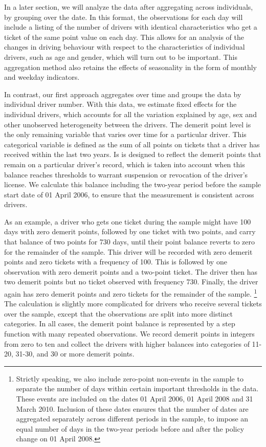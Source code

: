 \documentclass[12pt]{paper}
\begin{document}
In a later section, we will analyze the data after aggregating across individuals, by grouping over the date. 
In this format, the observations for each day will include a listing of the number of drivers with identical characteristics who get a ticket of the same point value on each day. 
This allows for an analysis of the changes in driving behaviour with respect to 
the characteristics of individual drivers, such as age and gender, which will turn out to be important. 
This aggregation method also retains the effects of seasonality in the form of monthly and weekday indicators. 

In contrast, our first approach aggregates over time and groups the data by individual driver number. 
With this data, we estimate fixed effects for the individual drivers, which accounts for all the variation explained by age, sex and other unobserved heterogeneity between the drivers.
The demerit point level is the only remaining variable that varies over time for a particular driver. 
% 
This categorical variable is defined as the sum of all points on tickets that a driver has received within the last two years. 
Is is designed to reflect the demerit points that remain on a particular driver's record, 
which is taken into account when this balance reaches thresholds to warrant suspension or revocation of the driver's license. 
We calculate this balance including the two-year period before the sample start date of 01 April 2006, to ensure that the measurement is consistent across drivers. 

As an example, a driver who gets one ticket during the sample might have 100 days with zero 
demerit points, followed by one ticket with two points, and carry that balance of two points for 730 days, until their point balance reverts to zero for the remainder of the sample. 
This driver will be recorded with zero demerit points and zero tickets with a frequency of 100. 
This is followed by one observation with zero demerit points and a two-point ticket. 
The driver then has two demerit points but no ticket observed with frequency 730. 
Finally, the driver again has zero demerit points and zero tickets for the remainder of the sample.%
\footnote{Strictly speaking, we also include zero-point non-events in the sample
to separate the number of days within certain important thresholds in the data. 
These events are included on the dates 01 April 2006, 01 April 2008 and 31 March 2010. 
Inclusion of these dates ensures that the number of dates are aggregated separately across 
different periods in the sample, to impose an equal number of days in the two-year periods before and after the policy change on 01 April 2008. }
The calculation is slightly more complicated for drivers who receive several tickets over the sample, 
except that the observations are split into more distinct categories. 
In all cases, the demerit point balance is represented by a step function with many repeated observations. 
We record demerit points in integers from zero to ten and collect the drivers with higher balances
into categories of 11-20, 31-30, and 30 or more demerit points. 
\end{document}
